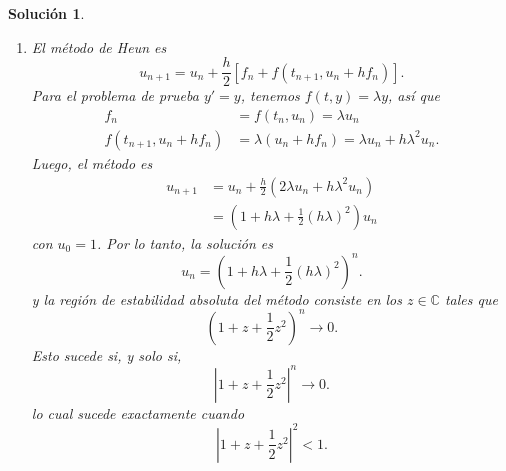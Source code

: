 \documentclass[11pt]{article}
\newtheorem*{sol}{Solución}
\newcommand\C{\mathbb C}
\begin{document}
\begin{sol}
  \begin{enumerate}
    \item
      El método de Heun es
      \begin{equation}
        u_{n+1} = u_n + \frac{h}{2}[f_n + f(t_{n+1},u_n+hf_n)]
      .\end{equation}
      Para el problema de prueba $y'=y$, tenemos $f(t,y)=\lambda y$,
      así que
      \begin{align}
        f_n
          &= f(t_n,u_n)
          = \lambda u_n \\
        f(t_{n+1},u_{n}+hf_n)
          &= \lambda(u_{n}+hf_n)
          = \lambda u_n + h\lambda^{2} u_n
      .\end{align}
      Luego, el método es
      \begin{align}
        u_{n+1}
        &= u_n + \frac{h}{2}(2\lambda u_n + h\lambda^{2} u_n) \\
        &= \left(1 + h\lambda + \frac{1}{2}(h\lambda)^{2}\right) u_n
      \end{align}
      con $u_0=1$.
      Por lo tanto, la solución es
      \begin{equation}
        u_n
        = \left(1 + h\lambda + \frac{1}{2}(h\lambda)^{2}\right)^{n}
      .\end{equation}
      y la región de estabilidad absoluta del método consiste en los
      $z\in\C$ tales que
      \begin{equation}
        \left(1 + z + \frac{1}{2}z^{2}\right)^{n} \to 0
      .\end{equation}
      Esto sucede si, y solo si, 
      \begin{equation}
        \left|1 + z + \frac{1}{2}z^{2}\right|^{n} \to 0
      .\end{equation}
      lo cual sucede exactamente cuando
      \begin{equation}
        \left|1 + z + \frac{1}{2}z^{2}\right|^{2}<1
      .\end{equation}
      

\end{enumerate}
\end{sol}
\end{document}
